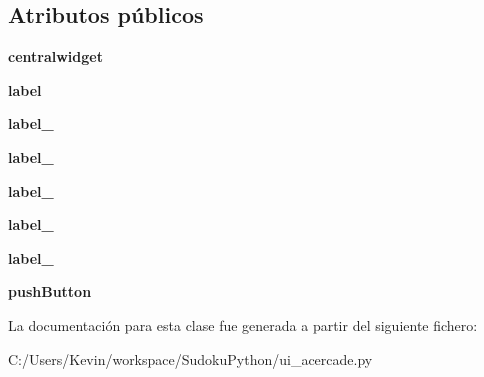 \subsection*{Atributos públicos}
\begin{DoxyCompactItemize}
\item 
{\bfseries centralwidget}\label{classui__acercade_1_1_ui__acerca_de_a95e78d45d17d029878bda51d82f560bd}

\item 
{\bfseries label}\label{classui__acercade_1_1_ui__acerca_de_add63f6385b5cf6cdc30660422bff4f4e}

\item 
{\bfseries label\-\_}\label{classui__acercade_1_1_ui__acerca_de_af5b713d3263b9ce93ac34a62f1fa8335}

\item 
{\bfseries label\-\_}\label{classui__acercade_1_1_ui__acerca_de_acc09e03251d385b6847e826e00212deb}

\item 
{\bfseries label\-\_}\label{classui__acercade_1_1_ui__acerca_de_ad601633dd874fef63408f5f516b0126b}

\item 
{\bfseries label\-\_}\label{classui__acercade_1_1_ui__acerca_de_aba0f1a1d551e469db2ca5ea1ed88c79a}

\item 
{\bfseries label\-\_}\label{classui__acercade_1_1_ui__acerca_de_aaae4e9fa8e2c464f02108ce9597fc23e}

\item 
{\bfseries push\-Button}\label{classui__acercade_1_1_ui__acerca_de_a3cf0beb8bb91aa01a42525db4f3d89ec}

\end{DoxyCompactItemize}


La documentación para esta clase fue generada a partir del siguiente fichero\-:\begin{DoxyCompactItemize}
\item 
C\-:/\-Users/\-Kevin/workspace/\-Sudoku\-Python/ui\-\_\-acercade.\-py\end{DoxyCompactItemize}
